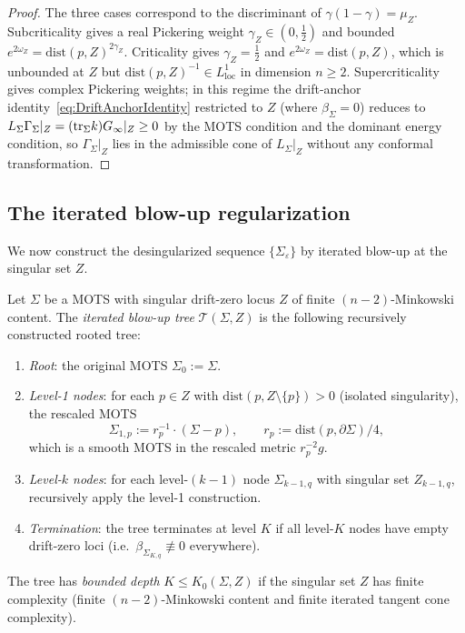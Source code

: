 \begin{proof}
The three cases correspond to the discriminant of $\gamma(1-\gamma)=\mu_Z$. Subcriticality gives a real Pickering weight $\gamma_Z\in(0,\tfrac12)$ and bounded $e^{2\omega_Z}=\mathrm{dist}(p,Z)^{2\gamma_Z}$. Criticality gives $\gamma_Z=\tfrac12$ and $e^{2\omega_Z}=\mathrm{dist}(p,Z)$, which is unbounded at $Z$ but $\mathrm{dist}(p,Z)^{-1}\in L^1_{\mathrm{loc}}$ in dimension $n\ge 2$. Supercriticality gives complex Pickering weights; in this regime the drift-anchor identity~\eqref{eq:DriftAnchorIdentity} restricted to $Z$ (where $\beta_\Sigma=0$) reduces to $L_\Sigma\Gamma_\Sigma|_Z=(\mathrm{tr}_\Sigma k)G_\infty|_Z\ge 0$ by the MOTS condition and the dominant energy condition, so $\Gamma_\Sigma|_Z$ lies in the admissible cone of $L_\Sigma|_Z$ without any conformal transformation.
\end{proof}

\subsection{The iterated blow-up regularization}

We now construct the desingularized sequence $\{\Sigma_\varepsilon\}$ by iterated blow-up at the singular set $Z$.

\begin{definition}\label{def:IteratedBlowUpTree}
Let $\Sigma$ be a MOTS with singular drift-zero locus $Z$ of finite $(n-2)$-Minkowski content. The \emph{iterated blow-up tree} $\mathcal T(\Sigma,Z)$ is the following recursively constructed rooted tree:
\begin{enumerate}
    \item \emph{Root}: the original MOTS $\Sigma_0:=\Sigma$.
    \item \emph{Level-1 nodes}: for each $p\in Z$ with $\mathrm{dist}(p,Z\setminus\{p\})>0$ (isolated singularity), the rescaled MOTS
    \[
        \Sigma_{1,p}:=r_p^{-1}\cdot(\Sigma-p),
        \qquad
        r_p:=\mathrm{dist}(p,\partial\Sigma)/4,
    \]
    which is a smooth MOTS in the rescaled metric $r_p^{-2}g$.
    \item \emph{Level-$k$ nodes}: for each level-$(k-1)$ node $\Sigma_{k-1,q}$ with singular set $Z_{k-1,q}$, recursively apply the level-1 construction.
    \item \emph{Termination}: the tree terminates at level $K$ if all level-$K$ nodes have empty drift-zero loci (i.e.\ $\beta_{\Sigma_{K,q}}\not\equiv 0$ everywhere).
\end{enumerate}
The tree has \emph{bounded depth} $K\le K_0(\Sigma,Z)$ if the singular set $Z$ has finite complexity (finite $(n-2)$-Minkowski content and finite iterated tangent cone complexity).
\end{definition}

